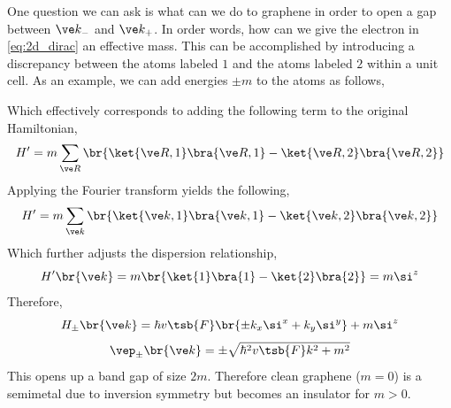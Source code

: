 \documentclass{article}
\begin{document}
One question we can ask is what can we do to graphene in order to open a gap between $\ve k_{-}$ and $\ve k_{+}$. In order words, how can we give the electron in \cref{eq:2d_dirac} an effective mass. This can be accomplished by introducing a discrepancy between the atoms labeled $1$ and the atoms labeled $2$ within a unit cell. As an example, we can add energies $\pm m$ to the atoms as follows,

\begin{center}
\end{center}

Which effectively corresponds to adding the following term to the original Hamiltonian,
\[ H' = m \sum_{\ve R} \br{\ket{\ve R, 1}\bra{\ve R, 1} - \ket{\ve R, 2}\bra{\ve R, 2}} \]
Applying the Fourier transform yields the following,
\[ H' = m \sum_{\ve k} \br{\ket{\ve k, 1}\bra{\ve k, 1} - \ket{\ve k, 2}\bra{\ve k, 2}} \]
Which further adjusts the dispersion relationship,
\[ H'\br{\ve k} = m \br{\ket{1}\bra{1} - \ket{2}\bra{2}} = m \si^{z} \]
Therefore,
\[ H_{\pm}\br{\ve k} =\hbar v\tsb{F} \br{\pm k_x \si^x + k_y \si^{y}} + m\si^{z} \]
\[ \vep_{\pm} \br{\ve k} = \pm \sqrt{\hbar^2 v\tsb{F} k^2 + m^2} \]
This opens up a band gap of size $2m$. Therefore clean graphene ($m=0$) is a semimetal due to inversion symmetry but becomes an insulator for $m > 0$. \\
\end{document}
